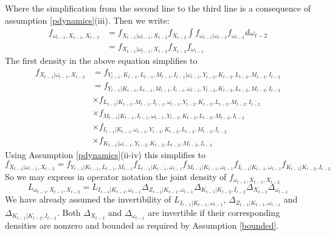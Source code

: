 \documentclass{article}
\begin{document}
Where the simplification from the second line to the third line is a consequence of assumption \eqref{pdynamics}(iii). Then we write:
\begin{equation*}
\begin{split}
f_{\omega_{t-1}, X_{t-1}, X_{t-2}}&=f_{X_{t-1}|\omega_{t-1}, X_{t-2}}f_{X_{t-2}}\int f_{\omega_{t-1}|\omega_{t-2}}f_{\omega_{t-2}}d\omega_{t-2}\\
&=f_{X_{t-1}|\omega_{t-1}, X_{t-2}}f_{X_{t-2}}f_{\omega_{t-1}}
\end{split}
\end{equation*}
The first density in the above equation simplifies to
\begin{equation*}
\begin{split}
f_{X_{t-1}|\omega_{t-1}, X_{t-2}}&=f_{Y_{t-1}, K_{t-1}, L_{t-1}, M_{t-1}, I_{t-1}|\omega_{t-1}, Y_{t-2}, K_{t-2}, L_{t-2}, M_{t-2}, I_{t-2}}\\
&=f_{Y_{t-1}|K_{t-1}, L_{t-1}, M_{t-1}, I_{t-1}, \omega_{t-1}, Y_{t-2}, K_{t-2}, L_{t-2}, M_{t-2}, I_{t-2}}\\
&\times f_{L_{t-1}|K_{t-1}, M_{t-1}, I_{t-1}, \omega_{t-1}, Y_{t-2}, K_{t-2}, L_{t-2}, M_{t-2}, I_{t-2}} \\
& \times f_{M_{t-1}|K_{t-1}, I_{t-1}, \omega_{t-1}, Y_{t-2}, K_{t-2}, L_{t-2}, M_{t-2}, I_{t-2}}\\
&\times f_{I_{t-1}|K_{t-1}, \omega_{t-1}, Y_{t-2}, K_{t-2}, L_{t-2}, M_{t-2}, I_{t-2}}\\
&\times f_{K_{t-1}|\omega_{t-1}, Y_{t-2}, K_{t-2}, L_{t-2}, M_{t-2}, I_{t-2}}
\end{split}
\end{equation*}
Using Assumption \eqref{pdynamics}(ii-iv) this simplifies to
\begin{equation*}
f_{X_{t-1}|\omega_{t-1}, X_{t-2}}=f_{Y_{t-1}|K_{t-1}, L_{t-1}, M_{t-1}}f_{L_{t-1}|K_{t-1}, \omega_{t-1}}f_{M_{t-1}|K_{t-1}, \omega_{t-1}}f_{I_{t-1}|K_{t-1}, \omega_{t-1}}f_{K_{t-1}|K_{t-2}, I_{t-2}}
\end{equation*}
So we may express in operator notation the joint density of $f_{\omega_{t-1}, X_{t-1}, X_{t-2}}$
\begin{equation*}
L_{\omega_{t-1}, X_{t-1}, X_{t-2}}=L_{I_{t-1}|K_{t-1}, \omega_{t-1}}\Delta_{Z_{t-1}|K_{t-1}, \omega_{t-1}}\Delta_{K_{t-1}|K_{t-2}, I_{t-2}}\Delta_{X_{t-2}}\Delta_{\omega_{t-1}}
\end{equation*}
We have already assumed the invertibility of $L_{I_{t-1}|K_{t-1}, \omega_{t-1}}$, $\Delta_{Z_{t-1}|K_{t-1}, \omega_{t-1}}$ and $\Delta_{K_{t-1}|K_{t-2}, I_{t-2}}$. Both $\Delta_{X_{t-2}}$ and $\Delta_{\omega_{t-1}}$ are invertible if their corresponding densities are nonzero and bounded as required by Assumption \eqref{bounded}.                                               
\end{document}
